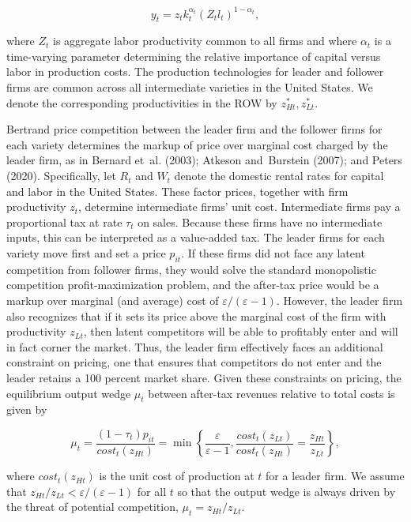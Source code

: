 \documentclass[11pt]{article}
\begin{document}
\[
y_t=z_tk_t^{\alpha_t}(Z_tl_t)^{1-\alpha_t},
\]


where $Z_{t}$ is aggregate labor productivity common to all firms and where $\alpha _{t}$ is a time-varying parameter determining the relative importance of capital versus labor in production costs. The production technologies for leader and follower firms are common across all intermediate varieties in the United States. We denote the corresponding productivities in the ROW by $z_{Ht}^{*},z_{Lt}^{*}$.

Bertrand price competition between the leader firm and the follower firms for each variety determines the markup of price over marginal cost charged by the leader firm, as in Bernard et al. (2003); Atkeson and Burstein (2007); and Peters (2020). Specifically, let $R_{t}$ and $W_{t}$ denote the domestic rental rates for capital and labor in the United States. These factor prices, together with firm productivity $z_{t}$, determine intermediate firms’ unit cost. Intermediate firms pay a proportional tax at rate $\tau _{t}$ on sales. Because these firms have no intermediate inputs, this can be interpreted as a value-added tax. The leader firms for each variety move first and set a price $p_{it}$. If these firms did not face any latent competition from follower firms, they would solve the standard monopolistic competition profit-maximization problem, and the after-tax price would be a markup over marginal (and average) cost of $\varepsilon /(\varepsilon -1)$. However, the leader firm also recognizes that if it sets its price above the marginal cost of the firm with productivity $z_{Lt}$, then latent competitors will be able to profitably enter and will in fact corner the market. Thus, the leader firm effectively faces an additional constraint on pricing, one that ensures that competitors do not enter and the leader retains a 100 percent market share. Given these constraints on pricing, the equilibrium output wedge $\mu _{t}$ between after-tax revenues relative to total costs is given by


\setcounter{equation}{5}
\begin{equation}\label{eq:6}
\mu_t=\frac{(1-\tau_t)p_{it}}{\mathit{cost}_t(z_{Ht})}=\min\left\{\frac{\varepsilon}{\varepsilon-1},\frac{\mathit{cost}_t(z_{Lt})}{\mathit{cost}_t(z_{Ht})}=\frac{z_{Ht}}{z_{Lt}}\right\},
\end{equation}


where $\mathit{cost}_{t}(z_{Ht})$ is the unit cost of production at $t$ for a leader firm. We assume that $z_{Ht}/z_{Lt}<\varepsilon /(\varepsilon -1)$ for all $t$ so that the output wedge is always driven by the threat of potential competition, $\mu _{t}=z_{Ht}/z_{Lt}$.
\end{document}
